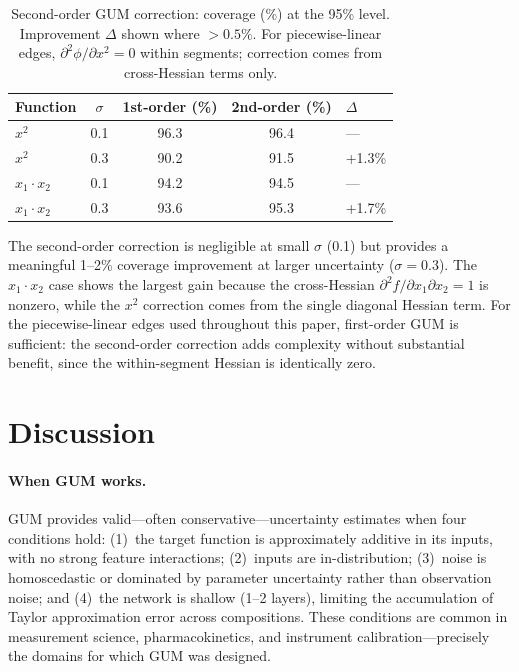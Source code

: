 \documentclass{article}
\begin{document}
\begin{table}[t]
\centering
\caption{Second-order GUM correction: coverage (\%) at the 95\% level.
Improvement $\Delta$ shown where $> 0.5\%$.  For piecewise-linear edges,
$\partial^2\phi/\partial x^2 = 0$ within segments; correction comes from
cross-Hessian terms only.}
\label{tab:second-order}
\begin{tabular}{@{}lcccl@{}}
\toprule
\textbf{Function} & \textbf{$\sigma$} & \textbf{1st-order (\%)} &
  \textbf{2nd-order (\%)} & \textbf{$\Delta$} \\
\midrule
$x^2$             & 0.1 & 96.3 & 96.4 & --- \\
$x^2$             & 0.3 & 90.2 & 91.5 & +1.3\% \\
$x_1 \cdot x_2$   & 0.1 & 94.2 & 94.5 & --- \\
$x_1 \cdot x_2$   & 0.3 & 93.6 & 95.3 & +1.7\% \\
\bottomrule
\end{tabular}
\end{table}

The second-order correction is negligible at small $\sigma$ (0.1) but
provides a meaningful 1--2\% coverage improvement at larger uncertainty
($\sigma = 0.3$).  The $x_1 \cdot x_2$ case shows the largest gain because
the cross-Hessian $\partial^2 f / \partial x_1 \partial x_2 = 1$ is nonzero,
while the $x^2$ correction comes from the single diagonal Hessian term.
For the piecewise-linear edges used throughout this paper, first-order GUM
is sufficient: the second-order correction adds complexity without
substantial benefit, since the within-segment Hessian is identically zero.

\section{Discussion}
\label{sec:discussion}

\paragraph{When GUM works.}
GUM provides valid---often conservative---uncertainty estimates when four
conditions hold: (1)~the target function is approximately additive in its
inputs, with no strong feature interactions; (2)~inputs are
in-distribution; (3)~noise is homoscedastic or dominated by parameter
uncertainty rather than observation noise; and (4)~the network is shallow
(1--2 layers), limiting the accumulation of Taylor approximation error across
compositions.  These conditions are common in measurement science,
pharmacokinetics, and instrument calibration---precisely the domains for which
GUM was designed.
\end{document}
